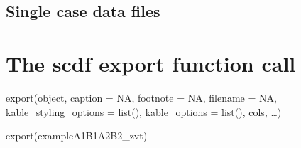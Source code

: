 \documentclass[
  letterpaper,
  DIV=11,
  numbers=noendperiod]{scrreprt}
\newenvironment{Shaded}{\begin{snugshade}}{\end{snugshade}}
\newcommand{\FunctionTok}[1]{\textcolor[rgb]{0.28,0.35,0.67}{#1}}
\newcommand{\NormalTok}[1]{\textcolor[rgb]{0.00,0.23,0.31}{#1}}
\begin{document}
\hypertarget{single-case-data-files}{%
\section{Single case data files}\label{single-case-data-files}}

\begin{tcolorbox}[enhanced jigsaw, breakable, rightrule=.15mm, bottomrule=.15mm, arc=.35mm, colback=white, colframe=quarto-callout-tip-color-frame, opacityback=0, leftrule=.75mm, toprule=.15mm, left=2mm]
\begin{minipage}[t]{5.5mm}
\textcolor{quarto-callout-tip-color}{\faLightbulb}
\end{minipage}%
\begin{minipage}[t]{\textwidth - 5.5mm}


\hypertarget{the-scdf-export-function-call}{%
\chapter{The scdf export function
call}\label{the-scdf-export-function-call}}

export(object, caption = NA, footnote = NA, filename = NA,
kable\_styling\_options = list(), kable\_options = list(), cols, \ldots)

\end{minipage}%
\end{tcolorbox}

\begin{Shaded}
\begin{Highlighting}[]
\FunctionTok{export}\NormalTok{(exampleA1B1A2B2\_zvt)}
\end{Highlighting}
\end{Shaded}
\end{document}
